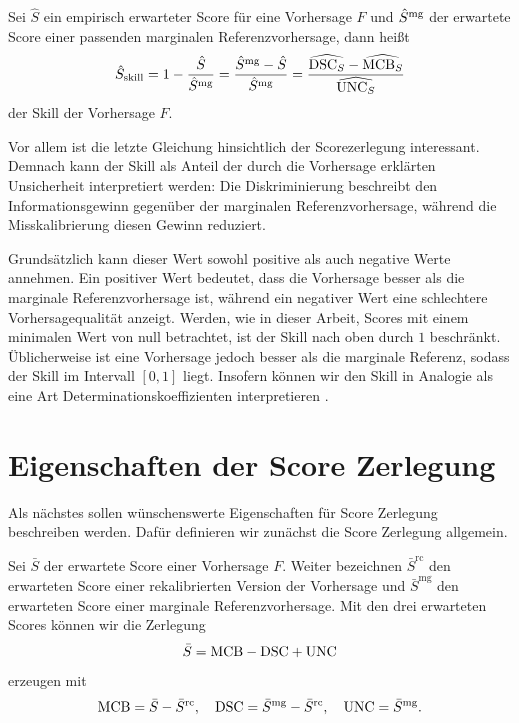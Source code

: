 \begin{defi}
Sei $\hat S$ ein empirisch erwarteter Score für eine Vorhersage $F$ und $\hat{S}^{\mathrm{mg}}$ der erwartete Score einer passenden marginalen Referenzvorhersage, dann heißt
    \[
    \hat S_{\mathrm{skill}}=1-\frac{\hat S}{\hat{S}^{\mathrm{mg}}}=\frac{\hat{S}^{\mathrm{mg}}-\hat{S}}{\hat{S}^{\mathrm{mg}}}=\frac{\widehat{\mathrm{DSC}_S}-\widehat{\mathrm{MCB}_S}}{\widehat{\mathrm{UNC}_S}}
    \]
der Skill der Vorhersage $F$.
\end{defi}

Vor allem ist die letzte Gleichung hinsichtlich der Scorezerlegung interessant. Demnach kann der Skill als Anteil der durch die Vorhersage erklärten Unsicherheit interpretiert werden: Die Diskriminierung beschreibt den Informationsgewinn gegenüber der marginalen Referenzvorhersage, während die Misskalibrierung diesen Gewinn reduziert.

Grundsätzlich kann dieser Wert sowohl positive als auch negative Werte annehmen. Ein positiver Wert bedeutet, dass die Vorhersage besser als die marginale Referenzvorhersage ist, während ein negativer Wert eine schlechtere Vorhersagequalität anzeigt. Werden, wie in dieser Arbeit, Scores mit einem minimalen Wert von null betrachtet, ist der Skill nach oben durch $1$ beschränkt. Üblicherweise ist eine Vorhersage jedoch besser als die marginale Referenz, sodass der Skill im Intervall $[0,1]$ liegt. Insofern können wir den Skill in Analogie als eine Art Determinationskoeffizienten interpretieren \parencite{gneiting2023regression}.


\section{Eigenschaften der Score Zerlegung} \label{seq:decomp_prop}
Als nächstes sollen wünschenswerte Eigenschaften für Score Zerlegung beschreiben werden. Dafür definieren wir zunächst die Score Zerlegung allgemein.

\begin{defi} \label{def:general_score_decomp}
Sei $\bar S$ der erwartete Score einer Vorhersage $F$. Weiter bezeichnen $\bar S^{\mathrm{rc}}$ den erwarteten Score einer rekalibrierten Version der Vorhersage und $\bar S^{\mathrm{mg}}$ den erwarteten Score einer marginale Referenzvorhersage.
Mit den drei erwarteten Scores können wir die Zerlegung
\[
\bar S = \mathrm{MCB} - \mathrm{DSC} + \mathrm{UNC}
\]
erzeugen mit
\[
\mathrm{MCB}=\bar S - \bar{S}^{\mathrm{rc}}, \quad
\mathrm{DSC}=\bar{S}^{\mathrm{mg}} - \bar{S}^{\mathrm{rc}}, \quad
\mathrm{UNC}= \bar{S}^{\mathrm{mg}}.
\]
\end{defi}

